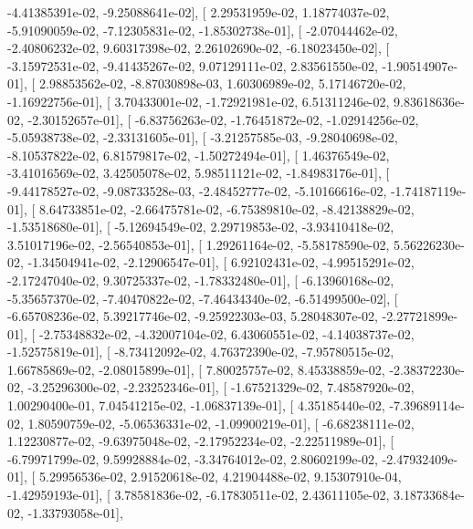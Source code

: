 \documentclass{article}
\begin{document}
         -4.41385391e-02,  -9.25088641e-02],
       [  2.29531959e-02,   1.18774037e-02,  -5.91090059e-02,
         -7.12305831e-02,  -1.85302738e-01],
       [ -2.07044462e-02,  -2.40806232e-02,   9.60317398e-02,
          2.26102690e-02,  -6.18023450e-02],
       [ -3.15972531e-02,  -9.41435267e-02,   9.07129111e-02,
          2.83561550e-02,  -1.90514907e-01],
       [  2.98853562e-02,  -8.87030898e-03,   1.60306989e-02,
          5.17146720e-02,  -1.16922756e-01],
       [  3.70433001e-02,  -1.72921981e-02,   6.51311246e-02,
          9.83618636e-02,  -2.30152657e-01],
       [ -6.83756263e-02,  -1.76451872e-02,  -1.02914256e-02,
         -5.05938738e-02,  -2.33131605e-01],
       [ -3.21257585e-03,  -9.28040698e-02,  -8.10537822e-02,
          6.81579817e-02,  -1.50272494e-01],
       [  1.46376549e-02,  -3.41016569e-02,   3.42505078e-02,
          5.98511121e-02,  -1.84983176e-01],
       [ -9.44178527e-02,  -9.08733528e-03,  -2.48452777e-02,
         -5.10166616e-02,  -1.74187119e-01],
       [  8.64733851e-02,  -2.66475781e-02,  -6.75389810e-02,
         -8.42138829e-02,  -1.53518680e-01],
       [ -5.12694549e-02,   2.29719853e-02,  -3.93410418e-02,
          3.51017196e-02,  -2.56540853e-01],
       [  1.29261164e-02,  -5.58178590e-02,   5.56226230e-02,
         -1.34504941e-02,  -2.12906547e-01],
       [  6.92102431e-02,  -4.99515291e-02,  -2.17247040e-02,
          9.30725337e-02,  -1.78332480e-01],
       [ -6.13960168e-02,  -5.35657370e-02,  -7.40470822e-02,
         -7.46434340e-02,  -6.51499500e-02],
       [ -6.65708236e-02,   5.39217746e-02,  -9.25922303e-03,
          5.28048307e-02,  -2.27721899e-01],
       [ -2.75348832e-02,  -4.32007104e-02,   6.43060551e-02,
         -4.14038737e-02,  -1.52575819e-01],
       [ -8.73412092e-02,   4.76372390e-02,  -7.95780515e-02,
          1.66785869e-02,  -2.08015899e-01],
       [  7.80025757e-02,   8.45338859e-02,  -2.38372230e-02,
         -3.25296300e-02,  -2.23252346e-01],
       [ -1.67521329e-02,   7.48587920e-02,   1.00290400e-01,
          7.04541215e-02,  -1.06837139e-01],
       [  4.35185440e-02,  -7.39689114e-02,   1.80590759e-02,
         -5.06536331e-02,  -1.09900219e-01],
       [ -6.68238111e-02,   1.12230877e-02,  -9.63975048e-02,
         -2.17952234e-02,  -2.22511989e-01],
       [ -6.79971799e-02,   9.59928884e-02,  -3.34764012e-02,
          2.80602199e-02,  -2.47932409e-01],
       [  5.29956536e-02,   2.91520618e-02,   4.21904488e-02,
          9.15307910e-04,  -1.42959193e-01],
       [  3.78581836e-02,  -6.17830511e-02,   2.43611105e-02,
          3.18733684e-02,  -1.33793058e-01],
\end{document}
